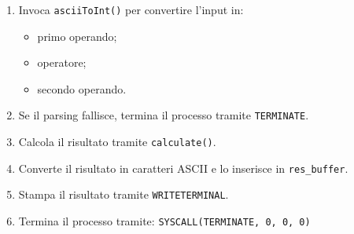 \documentclass[a4paper,12pt]{article}
\begin{document}
\begin{enumerate}
\begin{enumerate}
    \item Invoca \texttt{asciiToInt()} per convertire l'input in:
    \begin{itemize}
        \item primo operando;
        \item operatore;
        \item secondo operando.
    \end{itemize}

    \item Se il parsing fallisce, termina il processo tramite \texttt{TERMINATE}.

    \item Calcola il risultato tramite \texttt{calculate()}.

    \item Converte il risultato in caratteri ASCII e lo inserisce in \texttt{res\_buffer}.

    \item Stampa il risultato tramite \texttt{WRITETERMINAL}.

    \item Termina il processo tramite:
        \texttt{SYSCALL(TERMINATE, 0, 0, 0)}

\end{enumerate}
\end{enumerate}
\end{document}

